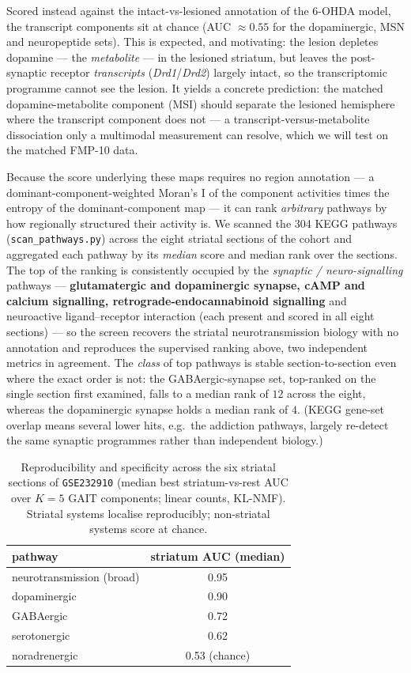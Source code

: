 \documentclass[11pt]{article}
\newcommand{\code}[1]{\texttt{#1}}
\begin{document}
Scored instead against the intact-vs-lesioned annotation of the 6-OHDA model, the transcript
components sit at chance (AUC $\approx 0.55$ for the dopaminergic, MSN and neuropeptide sets).
This is expected, and motivating: the lesion depletes dopamine --- the \emph{metabolite} ---
in the lesioned striatum, but leaves the post-synaptic receptor \emph{transcripts}
(\textit{Drd1}/\textit{Drd2}) largely intact, so the transcriptomic programme cannot see the
lesion. It yields a concrete prediction: the matched dopamine-metabolite component (MSI) should
separate the lesioned hemisphere where the transcript component does not --- a
transcript-versus-metabolite dissociation only a multimodal measurement can resolve, which we
will test on the matched FMP-10 data.

Because the score underlying these maps requires no region annotation --- a
dominant-component-weighted Moran's I of the component activities times the entropy of the
dominant-component map --- it can rank \emph{arbitrary} pathways by how regionally structured
their activity is. We scanned the 304 KEGG pathways (\code{scan\_pathways.py}) across the eight
striatal sections of the cohort and aggregated each pathway by its \emph{median} score and
median rank over the sections. The top of the ranking is consistently occupied by the
\emph{synaptic / neuro-signalling} pathways --- \textbf{glutamatergic and dopaminergic synapse,
cAMP and calcium signalling, retrograde-endocannabinoid signalling} and neuroactive
ligand--receptor interaction (each present and scored in all eight sections) --- so the screen
recovers the striatal neurotransmission biology with no annotation and reproduces the supervised
ranking above, two independent metrics in agreement. The \emph{class} of top pathways is stable
section-to-section even where the exact order is not: the GABAergic-synapse set, top-ranked on
the single section first examined, falls to a median rank of $12$ across the eight, whereas the
dopaminergic synapse holds a median rank of $4$. (KEGG gene-set overlap means several lower
hits, e.g.\ the addiction pathways, largely re-detect the same synaptic programmes rather than
independent biology.)

\begin{table}[t]
  \centering
  \caption{Reproducibility and specificity across the six striatal sections of
  \texttt{GSE232910} (median best striatum-vs-rest AUC over $K=5$ GAIT components; linear
  counts, KL-NMF). Striatal systems localise reproducibly; non-striatal systems score at
  chance.}
  \label{tab:robustness}
  \begin{tabular}{lc}
    \toprule
    pathway & striatum AUC (median) \\
    \midrule
    neurotransmission (broad) & 0.95 \\
    dopaminergic              & 0.90 \\
    GABAergic                 & 0.72 \\
    serotonergic              & 0.62 \\
    noradrenergic             & 0.53 (chance) \\
    \bottomrule
  \end{tabular}
\end{table}
\end{document}
